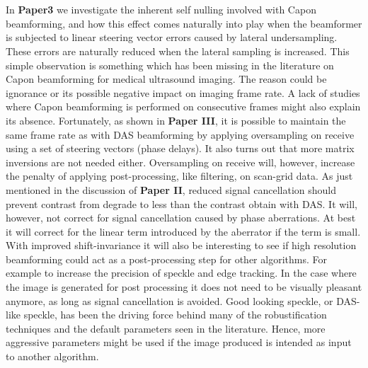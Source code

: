 \\\\
In \textbf{Paper3} we investigate the inherent self nulling involved with Capon beamforming, and how this effect comes naturally into play when the beamformer is subjected to linear steering vector errors caused by lateral undersampling. These errors are naturally reduced when the lateral sampling is increased. This simple observation is something which has been missing in the literature on Capon beamforming for medical ultrasound imaging. The reason could be ignorance or its possible negative impact on imaging frame rate. A lack of studies where Capon beamforming is performed on consecutive frames might also explain its absence. Fortunately, as shown in \textbf{Paper III}, it is possible to maintain the same frame rate as with DAS beamforming by applying oversampling on receive using a set of steering vectors (phase delays). It also turns out that more matrix inversions are not needed either. Oversampling on receive will, however,  increase the penalty of applying post-processing, like filtering,  on scan-grid data. %
As just mentioned in the discussion of \textbf{Paper II}, reduced signal cancellation should prevent contrast from degrade to less than the contrast obtain with DAS. It will, however,  not correct for signal cancellation caused by phase aberrations. At best it will correct for the linear term introduced by the aberrator if the term is small.
With improved shift-invariance it will also be interesting to see if high resolution beamforming could act as a post-processing step for other algorithms. For example to increase the precision of speckle and edge tracking. In the case where the image is generated for post processing it does not need to be visually pleasant anymore, as long as signal cancellation is avoided. Good looking speckle, or DAS-like speckle, has been the driving force behind many of the robustification techniques and the default parameters seen in the literature. Hence, more aggressive parameters might be used if the image produced is intended as input to another algorithm.
\\\\

